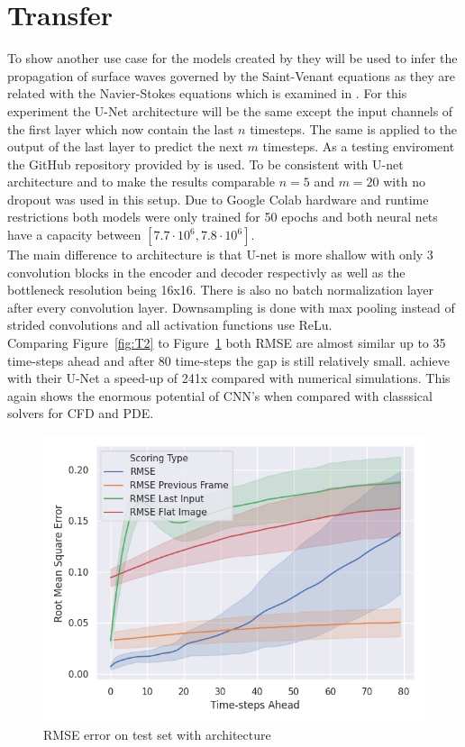 \documentclass[acmtog]{techreportacmart}
\begin{document}
\section{Transfer}
To show another use case for the models created by \cite{Thuerey20} they will be used to infer the propagation of surface waves governed by the Saint-Venant equations as they are related with the Navier-Stokes equations which is examined in \cite{Fotiadis2020}. For this experiment the U-Net architecture will be the same except the input channels of the first layer which now contain the last $n$ timesteps. The same is applied to the output of the last layer to predict the next $m$ timesteps. As a testing enviroment the GitHub repository provided by \cite{Fotiadis2020} is used. To be consistent with \cite{Fotiadis2020} U-net architecture and to make the results comparable $n=5$ and $m=20$ with no dropout was used in this setup. Due to Google Colab hardware and runtime restrictions both models were only trained for 50 epochs and both neural nets have a capacity between $[7.7 \cdot 10^6, 7.8 \cdot 10^6]$.\\
The main difference to \cite{Thuerey20} architecture is that \cite{Fotiadis2020} U-net is more shallow with only 3 convolution blocks in the encoder and decoder respectivly as well as the bottleneck resolution being 16x16. There is also no batch normalization layer after every convolution layer. Downsampling is done with max pooling instead of strided convolutions and all activation functions use ReLu. \\
Comparing Figure~\ref{fig:T2} to Figure~\ref{fig:T1} both RMSE are almost similar up to 35 time-steps ahead and after 80 time-steps the gap is still relatively small. \cite{Fotiadis2020} achieve with their U-Net a speed-up of 241x compared with numerical simulations. This again shows the enormous potential of CNN's when compared with classsical solvers for CFD and PDE.

\begin{figure}[H]
  \includegraphics[width=.4\textwidth]{figures/transfer/DFP_Test_RMSE_Quality_start_15}
  \caption{RMSE error on test set with \cite{Thuerey20} architecture}
  \label{fig:T1}
\end{figure}
\end{document}
